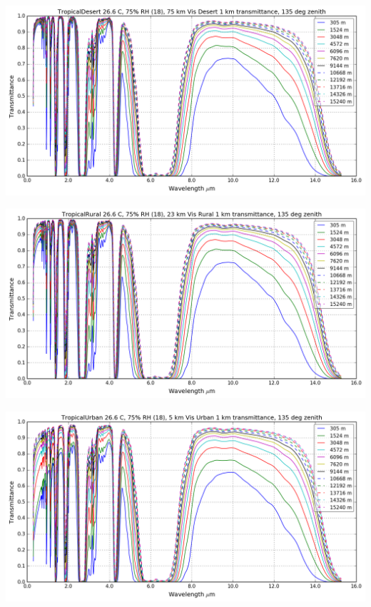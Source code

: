 \documentclass{workpackage}
\begin{document}
\begin{center}
\includegraphics{./pic/Analyse-Standard-Atmospheres_17_7.png}
\end{center}

\begin{center}
\includegraphics{./pic/Analyse-Standard-Atmospheres_17_8.png}
\end{center}

\begin{center}
\includegraphics{./pic/Analyse-Standard-Atmospheres_17_9.png}
\end{center}
\end{document}
